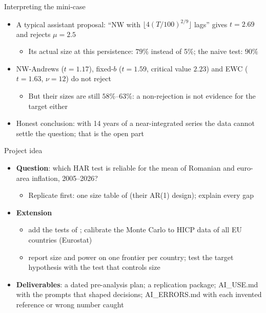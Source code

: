 \begin{frame}{Interpreting the mini-case}
\itemsize{\footnotesize}
\begin{itemize}
    \item A typical assistant proposal: ``NW with $\lfloor 4(T/100)^{2/9}\rfloor$ lags'' gives $t = 2.69$ and rejects $\mu = 2.5$
    \begin{itemize}
        \item Its actual size at this persistence: $79\%$ instead of 5\%; the naive test: $90\%$
    \end{itemize}
    \item NW-Andrews ($t = 1.17$), fixed-$b$ ($t = 1.59$, critical value $2.23$) and EWC ($t = 1.63$, $\nu = 12$) do not reject
    \begin{itemize}
        \item But their sizes are still $58\%$--$63\%$: a non-rejection is not evidence for the target either
    \end{itemize}
    \item Honest conclusion: with 14 years of a near-integrated series the data cannot settle the question; that is the open part
\end{itemize}
\end{frame}

\begin{frame}{Project idea}
\itemsize{\footnotesize}
\begin{itemize}
    \item \textbf{Question}: which HAR test is reliable for the mean of Romanian and euro-area inflation, 2005--2026?
    \begin{itemize}
        \item Replicate first: one size table of  (their AR(1) design); explain every gap
    \end{itemize}
    \item \textbf{Extension}
    \begin{itemize}
        \item add the tests of ; calibrate the Monte Carlo to HICP data of all EU countries (Eurostat)
        \item report size and power on one frontier per country; test the target hypothesis with the test that controls size
    \end{itemize}
    \item \textbf{Deliverables}: a dated pre-analysis plan; a replication package; AI\_USE.md with the prompts that shaped decisions; AI\_ERRORS.md with each invented reference or wrong number caught
\end{itemize}
\end{frame}


